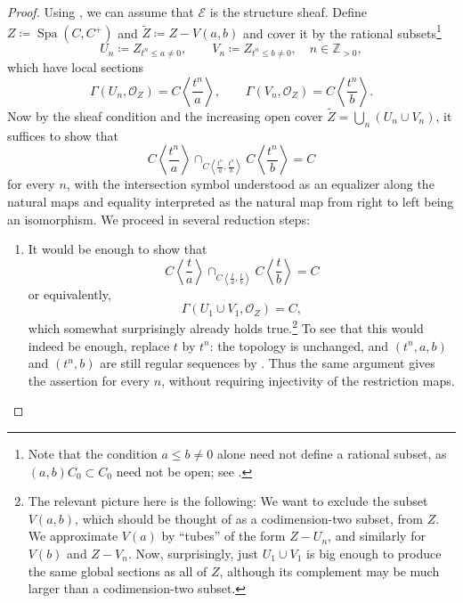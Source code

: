 \documentclass[10pt,twoside]{article}
\numberwithin{equation}{section}
\theoremstyle{plain}
\theoremstyle{definition}
\DeclareMathOperator{\Spa}{Spa}
\newcommand{\ZZ}{\mathbb{Z}}
\newcommand{\MCE}{\mathcal{E}}
\newcommand{\MCO}{\mathcal{O}}
\begin{document}
\begin{proof}
Using , we can assume that \(\MCE\) is the structure sheaf. Define \(Z\coloneqq\Spa(C,C^+)\) and \(\tilde Z\coloneqq Z-V(a,b)\) and cover it by the rational subsets\footnote{Note that the condition \(a\leq b\neq 0\) alone need not define a rational subset, as \((a,b)C_0\subset C_0\) need not be open; see \cite[Definition 3.1.1]{SW20}.}
\[U_n\coloneqq Z_{t^n\leq a\neq 0},\qquad V_n\coloneqq Z_{t^n\leq b\neq 0},\quad n\in \ZZ_{>0},\]
which have local sections
\[\Gamma(U_n,\MCO_Z)=C\left\langle\frac{t^n}{a}\right\rangle,\qquad
\Gamma(V_n,\MCO_Z)=C\left\langle\frac{t^n}{b}\right\rangle.
\]
Now by the sheaf condition and the increasing open cover \(\tilde Z=\bigcup_n(U_n\cup V_n)\), it suffices to show that
\[C\left\langle\frac{t^n}{a}\right\rangle
\cap_{C\left\langle\frac{t^n}{a},\frac{t^n}{b}\right\rangle}
C\left\langle\frac{t^n}{b}\right\rangle=C\]
for every \(n\), with the intersection symbol understood as an equalizer along the natural maps and equality interpreted as the natural map from right to left being an isomorphism.
We proceed in several reduction steps:
\begin{enumerate}
    \item It would be enough to show that
    \[C\left\langle\frac{t}{a}\right\rangle
    \cap^{}_{C\left\langle\frac{t}{a},\frac{t}{b}\right\rangle} C\left\langle\frac{t}{b}\right\rangle = C\]
    or equivalently,
    \[\Gamma(U_1\cup V_1,\MCO_Z)=C,\]
    which somewhat surprisingly already holds true.\footnote{The relevant picture here is the following: We want to exclude the subset \(V(a,b)\), which should be thought of as a codimension-two subset, from \(Z\). We approximate \(V(a)\) by ``tubes'' of the form \(Z-U_n\), and similarly for \(V(b)\) and \(Z-V_n\). Now, surprisingly, just \(U_1\cup V_1\) is big enough to produce the same global sections as all of \(Z\), although its complement may be much larger than a codimension-two subset.}
    To see that this would indeed be enough, replace \(t\) by \(t^n\): the topology is unchanged, and \((t^n,a,b)\) and \((t^n,b)\) are still regular sequences by \cite[07DV]{Stacks}. Thus the same argument gives the assertion for every \(n\), without requiring injectivity of the restriction maps.


\end{enumerate}
\end{proof}
\end{document}
